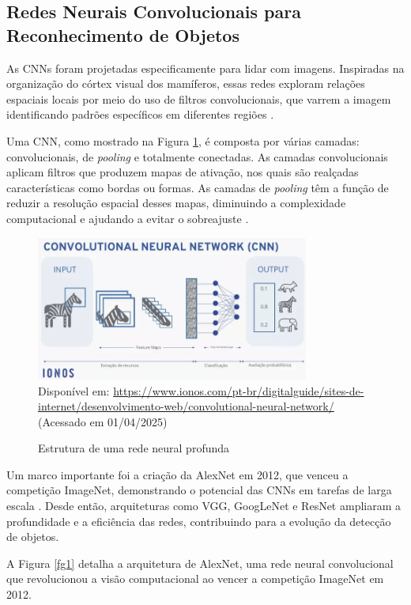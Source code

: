 \subsection{\textbf{Redes Neurais Convolucionais para Reconhecimento de Objetos}}
As CNNs foram projetadas especificamente para lidar com imagens. Inspiradas na organização do córtex visual dos mamíferos, essas redes exploram relações espaciais locais por meio do uso de filtros convolucionais, que varrem a imagem identificando padrões específicos em diferentes regiões \cite{lecun2015}.

Uma CNN, como mostrado na Figura \ref{fg-cnn}, é composta por várias camadas: convolucionais, de \textit{pooling} e totalmente conectadas. As camadas convolucionais aplicam filtros que produzem mapas de ativação, nos quais são realçadas características como bordas ou formas. As camadas de \textit{pooling} têm a função de reduzir a resolução espacial desses mapas, diminuindo a complexidade computacional e ajudando a evitar o sobreajuste \cite{gu2018}.

\begin{figure}[htbp]
  \centering
  \caption{Estrutura de uma rede neural profunda}
  \includegraphics[width=0.8\textwidth]{Figuras/cnn.png}
  \\
  Disponível em: \url{https://www.ionos.com/pt-br/digitalguide/sites-de-internet/desenvolvimento-web/convolutional-neural-network/} (Acessado em 01/04/2025)
  \label{fg-cnn}
\end{figure}

Um marco importante foi a criação da AlexNet em 2012, que venceu a competição ImageNet, demonstrando o potencial das CNNs em tarefas de larga escala \cite{krizhevsky2012}. Desde então, arquiteturas como VGG, GoogLeNet e ResNet ampliaram a profundidade e a eficiência das redes, contribuindo para a evolução da detecção de objetos.

A Figura \ref{fg1} detalha a arquitetura de AlexNet, uma rede neural convolucional que revolucionou a visão computacional ao vencer a competição ImageNet em 2012.

